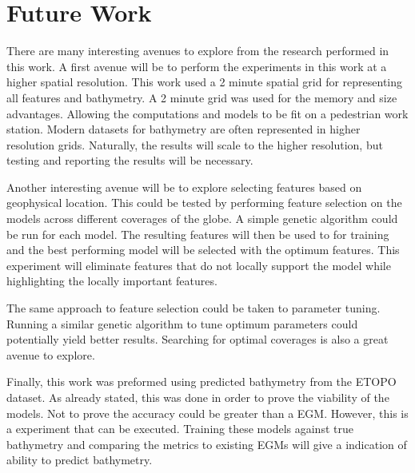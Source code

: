 \section{Future Work}
\setlength{\parindent}{10ex}
There are many interesting avenues to explore from the research performed in this work.
A first avenue will be to perform the experiments in this work at a higher spatial resolution.
This work used a 2 minute spatial grid for representing all features and bathymetry.
A 2 minute grid was used for the memory and size advantages.
Allowing the computations and models to be fit on a pedestrian work station.
Modern datasets for bathymetry are often represented in higher resolution grids.
Naturally, the results will scale to the higher resolution, but testing and reporting the results will be necessary.

\par
Another interesting avenue will be to explore selecting features based on geophysical location.
This could be tested by performing feature selection on the models across different coverages of the globe.
A simple genetic algorithm could be run for each model.
The resulting features will then be used to for training and the best performing model will be selected with the optimum features.
This experiment will eliminate features that do not locally support the model while highlighting the locally important features.

\par
The same approach to feature selection could be taken to parameter tuning.
Running a similar genetic algorithm to tune optimum parameters could potentially yield better results.
Searching for optimal coverages is also a great avenue to explore.

\par
Finally, this work was preformed using predicted bathymetry from the ETOPO dataset.
As already stated, this was done in order to prove the viability of the models.
Not to prove the accuracy could be greater than a \ac{EGM}.
However, this is a experiment that can be executed.
Training these models against true bathymetry and comparing the metrics to existing \ac{EGM}s will give a indication of ability to predict bathymetry.